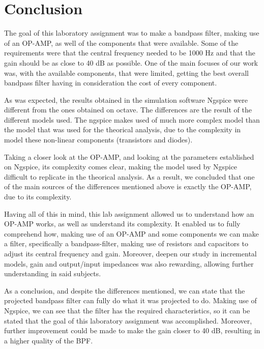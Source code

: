 \section{Conclusion}
\label{sec:conclusion}

\tab The goal of this laboratory assignment was to make a bandpass filter, making use of an OP-AMP, as well of the components that were available. Some of the requirements were that the central frequency needed to be 1000 Hz and that the gain should be as close to 40 dB as possible. One of the main focuses of our work was, with the available components, that were limited, getting the best overall bandpass filter having in consideration the cost of every component. 

As was expected, the results obtained in the simulation software Ngspice were different from the ones obtained on octave. The differences are the result of the different models used. The ngspice makes used of much more complex model than the model that was used for the theorical analysis, due to the complexity in model these non-linear components (transistors and diodes). 

Taking a closer look at the OP-AMP, and looking at the parameters established on Ngspice, its complexity comes clear, making the model used by Ngspice difficult to replicate in the theorical analysis. As a result, we concluded that one of the main sources of the differences mentioned above is exactly the OP-AMP, due to its complexity. 

Having all of this in mind, this lab assignment allowed us to understand how an OP-AMP works, as well as understand its complexity. It enabled us to fully comprehend how, making use of an OP-AMP and some components we can make a filter, specifically a bandpass-filter, making use of resistors and capacitors to adjust its central frequency and gain. Moreover, deepen our study in incremental models, gain and output/input impedances was also rewarding, allowing further understanding in said subjects. 

As a conclusion, and despite the differences mentioned, we can state that the projected bandpass filter can fully do what it was projected to do. Making use of Ngspice, we can see that the filter has the required characteristics, so it can be stated that the goal of this laboratory assignment was accomplished. 
Moreover, further improvement could be made to make the gain closer to 40 dB, resulting in a higher quality of the BPF. 

